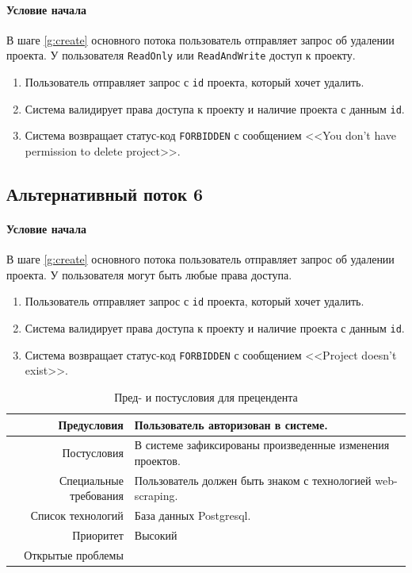 \documentclass[a4paper,12pt]{article}
\begin{document}
\paragraph*{Условие начала} В шаге \ref{g:create} основного потока пользователь отправляет запрос об удалении проекта. У пользователя \texttt{ReadOnly} или \texttt{ReadAndWrite} доступ к проекту.

\begin{enumerate}
    \def\labelenumi{\arabic{enumi}.}
    \item Пользователь отправляет запрос с \texttt{id} проекта, который хочет удалить.
    \item Система валидирует права доступа к проекту и наличие проекта с данным \texttt{id}.
    \item Система возвращает статус-код \texttt{FORBIDDEN} с сообщением <<You don't have permission to delete project>>.
\end{enumerate}

\subsection*{Альтернативный поток 6}

\paragraph*{Условие начала} В шаге \ref{g:create} основного потока пользователь отправляет запрос об удалении проекта. У пользователя могут быть любые права доступа.

\begin{enumerate}
    \def\labelenumi{\arabic{enumi}.}
    \item Пользователь отправляет запрос с \texttt{id} проекта, который хочет удалить.
    \item Система валидирует права доступа к проекту и наличие проекта с данным \texttt{id}.
    \item Система возвращает статус-код \texttt{FORBIDDEN} с сообщением <<Project doesn't exist>>.
\end{enumerate}


\begin{longtable}[]{|@{\textbf}r|p{7cm}|} 
\caption{Пред- и постусловия для прецендента}
\hline
    Предусловия            &  Пользователь авторизован в системе. \\ \hline
    Постусловия            & В системе зафиксированы произведенные изменения проектов.                                                                          \\ \hline
    Специальные требования & Пользователь должен быть знаком с технологией web-scraping. \\ \hline
    Список технологий      & База данных Postgresql.   \\ \hline
    Приоритет              & Высокий \\ \hline
    Открытые проблемы      &                                                                                                                                    \\ \hline
\end{longtable}
\end{document}
